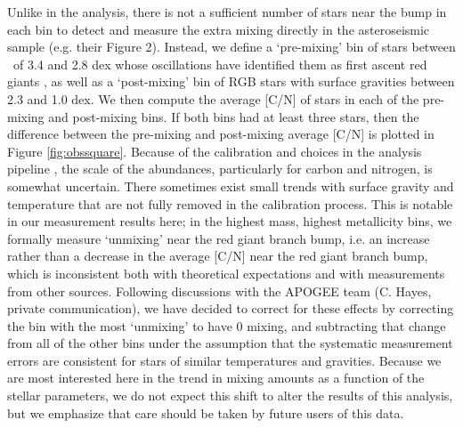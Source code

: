 Unlike in the \citet{Shetrone2019} analysis, there is not a sufficient number of stars near the bump in each bin to detect and measure the extra mixing directly in the asteroseismic sample (e.g. their Figure 2). Instead, we define a `pre-mixing' bin of stars between \logg\ of 3.4 and 2.8 dex whose oscillations have identified them as first ascent red giants \citep{Elsworth2019}, as well as a `post-mixing' bin of RGB stars with surface gravities between 2.3 and 1.0 dex. We then compute the average [C/N] of stars in each of the pre-mixing and post-mixing bins. If both bins had at least three stars, then the difference between the pre-mixing and post-mixing average [C/N] is plotted in Figure \ref{fig:obssquare}. Because of the calibration and choices in the analysis pipeline
\citep[see e.g.][]{Holtzman2018,Jonsson2020, vsmith_apogee_dr16_2021}, the scale of the abundances, particularly for carbon and nitrogen, is somewhat uncertain.
There sometimes exist small trends with surface gravity and temperature that are not fully removed in the calibration process. This is notable in our measurement results here; in the highest mass, highest metallicity bins, we formally measure `unmixing' near the red giant branch bump, i.e. an increase rather than a decrease in the average [C/N] near the red giant branch bump, which is inconsistent both with theoretical expectations and with measurements from other sources. Following discussions with the APOGEE team (C. Hayes, private communication), we have decided to correct for these effects by correcting the bin with the most `unmixing' to have 0 mixing, and subtracting that change from all of the other bins under the assumption that the systematic measurement errors are consistent for stars of similar temperatures and gravities. Because we are most interested here in the trend in mixing amounts as a function of the stellar parameters, we do not expect this shift to alter the results of this analysis, but we emphasize that care should be taken by future users of this data. 

